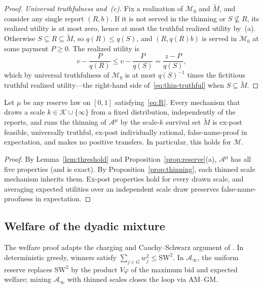 \documentclass[format=acmsmall, review=false]{acmart}
\newcommand{\SW}{\mathrm{SW}}
\theoremstyle{acmdefinition}%
\begin{document}
\begin{proof}
\emph{Universal truthfulness and~(c).} Fix a realization of
\(\mathcal M_0\) and \(\widetilde M\), and consider any single
report \((R,b)\). If it is not served in the thinning or
\(S\not\subseteq R\), its realized utility is at most zero, hence
at most the truthful realized utility by~(a). Otherwise
\(S\subseteq R\subseteq\widetilde M\), so \(q(R)\le q(S)\), and
\((R,q(R)b)\) is served in \(\mathcal M_0\) at some payment
\(P\ge0\). The realized utility is
\[
v-\frac{P}{q(R)}\le v-\frac{P}{q(S)}=\frac{z-P}{q(S)},
\]
which by universal truthfulness of \(\mathcal M_0\) is at most
\(q(S)^{-1}\) times the fictitious truthful realized utility---the
right-hand side of~\eqref{eq:thin-truthful} when
\(S\subseteq\widetilde M\).
\end{proof}

\begin{corollary}\label{cor:mixture}
Let \(\mu\) be any reserve law on \([0,1]\) satisfying~\eqref{eq:R}.
Every mechanism that draws a scale
\(k\in\mathcal K\cup\{\infty\}\) from a fixed distribution,
independently of the reports, and runs the thinning of
\(\mathcal A^{\mu}\) by the scale-\(k\) survival set
\(\widetilde M\) is ex-post feasible, universally truthful,
ex-post individually rational, false-name-proof in expectation,
and makes no positive transfers. In particular, this holds for
\(\mathcal M\).
\end{corollary}

\begin{proof}
By Lemma~\ref{lem:threshold} and Proposition~\ref{prop:reserve}(a),
\(\mathcal A^{\mu}\) has all five properties (and is exact). By
Proposition~\ref{prop:thinning}, each thinned scale mechanism
inherits them. Ex-post properties hold for every drawn scale, and
averaging expected utilities over an independent scale draw
preserves false-name-proofness in expectation.
\end{proof}

\subsection{Welfare of the dyadic mixture}
\label{sec:rand-welfare}

The welfare proof adapts the charging and Cauchy--Schwarz argument
of \citet[Theorem~3]{lehmann2002truth}. In deterministic greedy,
winners satisfy \(\sum_{j\in G}w_j^2\le\SW^2\). In
\(\mathcal A_\infty\), the uniform reserve replaces \(\SW^2\) by
the product \(V\varphi\) of the maximum bid and expected welfare;
mixing \(\mathcal A_\infty\) with thinned scales closes the loop
via AM--GM.
\end{document}
